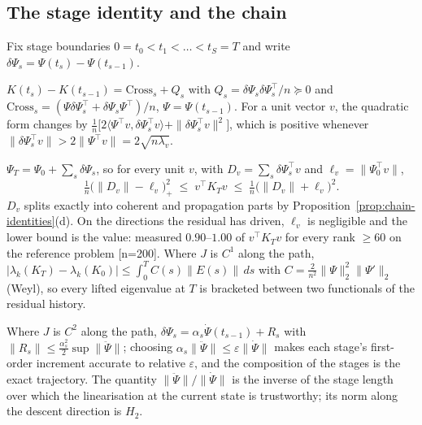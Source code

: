 \subsection{The stage identity and the chain}
\label{ssec:chain-stage}

Fix stage boundaries $0=t_0<t_1<\dots<t_S=T$ and write
$\delta\Psi_s=\Psi(t_s)-\Psi(t_{s-1})$.

\begin{proposition}
\label{prop:stage}
$K(t_s)-K(t_{s-1})=\mathrm{Cross}_s+Q_s$ with
$Q_s=\delta\Psi_s\delta\Psi_s^{\!\top}/n\succeq0$ and
$\mathrm{Cross}_s=(\Psi\delta\Psi_s^{\!\top}+\delta\Psi_s\Psi^{\!\top})/n$,
$\Psi=\Psi(t_{s-1})$. For a unit vector $v$, the quadratic form changes by
$\frac1n\big[2\langle\Psi^{\!\top}v,\delta\Psi_s^{\!\top}v\rangle+\|\delta\Psi_s^{\!\top}v\|^2\big]$,
which is positive whenever $\|\delta\Psi_s^{\!\top}v\|>2\|\Psi^{\!\top}v\|=2\sqrt{n\lambda_v}$.
\end{proposition}

\begin{theorem}
\label{thm:bracket}
$\Psi_T=\Psi_0+\sum_s\delta\Psi_s$, so for every unit $v$, with
$D_v=\sum_s\delta\Psi_s^{\!\top}v$ and $\ell_v=\|\Psi_0^{\!\top}v\|$,
\[
\tfrac1n\big(\|D_v\|-\ell_v\big)_+^2\;\le\;v^{\!\top}K_Tv\;\le\;\tfrac1n\big(\|D_v\|+\ell_v\big)^2 .
\]
$D_v$ splits exactly into coherent and propagation parts by
Proposition~\ref{prop:chain-identities}(d). On the directions the residual has
driven, $\ell_v$ is negligible and the lower bound is the value: measured
$0.90$--$1.00$ of $v^{\!\top}K_Tv$ for every rank $\ge60$ on the reference
problem [n=200]. Where $J$ is $C^1$ along the path,
$|\lambda_k(K_T)-\lambda_k(K_0)|\le\int_0^T C(s)\|E(s)\|\,ds$ with
$C=\frac2{n^2}\|\Psi\|_2^2\|\Psi'\|_2$ (Weyl), so every lifted eigenvalue at $T$
is bracketed between two functionals of the residual history.
\end{theorem}

\begin{theorem}
\label{thm:chain}
Where $J$ is $C^2$ along the path,
$\delta\Psi_s=\alpha_s\dot\Psi(t_{s-1})+R_s$ with
$\|R_s\|\le\frac{\alpha_s^2}2\sup\|\ddot\Psi\|$; choosing
$\alpha_s\|\ddot\Psi\|\le\varepsilon\|\dot\Psi\|$ makes each stage's first-order
increment accurate to relative $\varepsilon$, and the composition of the
stages is the exact trajectory. The quantity $\|\ddot\Psi\|/\|\dot\Psi\|$ is the
inverse of the stage length over which the linearisation at the current state
is trustworthy; its norm along the descent direction is $H_2$.
\end{theorem}

